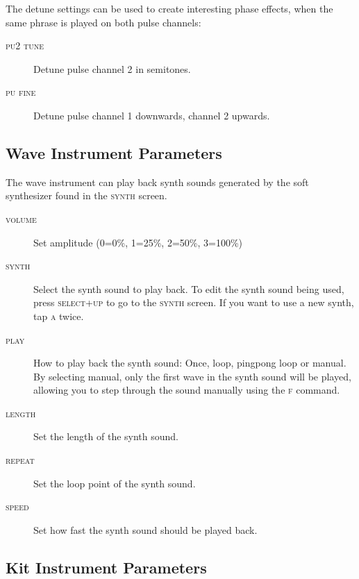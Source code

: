 \label{detune}
The detune settings can be used to create interesting phase effects, when the same phrase is played on both pulse channels:

\begin{description}
	\item[\textsc{pu2 tune}] Detune pulse channel 2 in semitones.
	\item[\textsc{pu fine}] Detune pulse channel 1 downwards, channel 2 upwards.
\end{description}

\subsection{Wave Instrument Parameters}

The wave instrument can play back synth sounds generated by the soft synthesizer found in the \textsc{synth} screen.

\begin{figure}[hbtp]
	\begin{center}
	\end{center}
\end{figure}

\begin{description}
	\item[\textsc{volume}] Set amplitude (0=0\%, 1=25\%, 2=50\%, 3=100\%)
	\item[\textsc{synth}] Select the synth sound to play back. To edit the synth sound being used, press \textsc{select+up} to go to the \textsc{synth} screen. If you want to use a new synth, tap \textsc{a} twice.
	\item[\textsc{play}] How to play back the synth sound: Once, loop, pingpong loop or manual. By selecting manual, only the first wave in the synth sound will be played, allowing you to step through the sound manually using the \textsc{f} command.
	\item[\textsc{length}] Set the length of the synth sound.
	\item[\textsc{repeat}] Set the loop point of the synth sound.
	\item[\textsc{speed}] Set how fast the synth sound should be played back.
\end{description}

\subsection{Kit Instrument Parameters}


